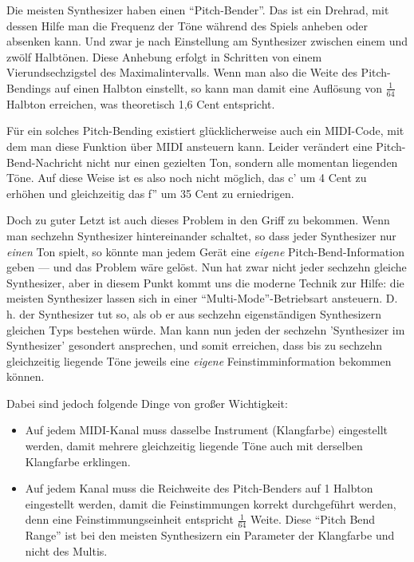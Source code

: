 Die meisten Synthesizer haben einen "`Pitch-Bender"'. Das ist ein
Drehrad, mit dessen Hilfe man die Frequenz der Töne während des Spiels
anheben oder absenken kann. Und zwar je nach Einstellung am
Synthesizer zwischen einem und zwölf Halbtönen. Diese Anhebung erfolgt
in Schritten von einem Vierundsechzigstel des Maximalintervalls. Wenn
man also die Weite des Pitch-Bendings auf einen Halbton einstellt, so
kann man damit eine Auflösung von $\frac{1}{64}$ Halbton erreichen, was
theoretisch 1,6 Cent entspricht.

Für ein solches Pitch-Bending existiert glücklicherweise auch ein
MIDI-Code, mit dem man diese Funktion über MIDI ansteuern kann. Leider
verändert eine Pitch-Bend-Nachricht nicht nur einen gezielten Ton,
sondern alle momentan liegenden Töne. Auf diese Weise ist es also noch
nicht möglich, das c' um 4 Cent zu erhöhen und gleichzeitig das f'' um
35 Cent zu erniedrigen.

Doch zu guter Letzt ist auch dieses Problem in den Griff zu bekommen.
Wenn man sechzehn Synthesizer
hintereinander schaltet, so dass jeder Synthesizer nur \emph{einen} Ton
spielt, so könnte man jedem Gerät eine \emph{eigene} 
Pitch-Bend-Information geben --- 
und das Problem wäre gelöst. Nun hat zwar nicht
jeder sechzehn gleiche Synthesizer, aber in diesem Punkt kommt uns die
moderne Technik zur Hilfe: die meisten Synthesizer lassen sich in
einer "`Multi-Mode"'-Betriebsart ansteuern. D.\,h. der Synthesizer tut
so, als ob er aus sechzehn eigenständigen Synthesizern gleichen Typs
bestehen würde. Man kann nun jeden der sechzehn 'Synthesizer im
Synthesizer' gesondert ansprechen, und somit erreichen, dass bis zu
sechzehn gleichzeitig liegende Töne jeweils eine \emph{eigene}
Feinstimminformation bekommen können.

Dabei sind jedoch folgende Dinge von großer Wichtigkeit:
\begin{itemize}
\item Auf jedem MIDI-Kanal muss dasselbe Instrument (Klangfarbe)
  eingestellt werden, damit mehrere gleichzeitig liegende Töne auch
  mit derselben Klangfarbe erklingen.
\item Auf jedem Kanal muss die Reichweite des Pitch-Benders auf 1
  Halbton eingestellt werden, damit die Feinstimmungen korrekt
  durchgeführt werden, denn eine Feinstimmungseinheit entspricht
  $\frac{1}{64}$ Weite. Diese "`Pitch Bend Range"' ist bei den meisten
  Synthesizern ein Parameter der Klangfarbe und nicht des Multis.
\end{itemize}

